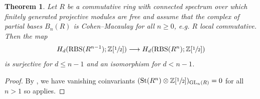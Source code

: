 \documentclass[12pt, reqno]{amsart}
\theoremstyle{plain}
\newtheorem{theorem}{Theorem}[section]
\theoremstyle{definition}
\newcommand{\Z}{\mathbb Z}
\begin{document}
\begin{theorem}\label{PID and partial bases}
Let $R$ be a commutative ring with connected spectrum over which finitely generated projective modules are free and assume that the complex of partial bases $B_n(R)$ is Cohen–Macaulay for all $n\geq 0$, e.g. $R$ local commutative. Then the map
\begin{align*}
H_d(\operatorname{RBS}(R^{n-1}); \Z[\sfrac{1}{2}])\longrightarrow H_d(\operatorname{RBS}(R^n); \Z[\sfrac{1}{2}])
\end{align*}
is surjective for $d\leq n-1$ and an isomorphism for $d< n-1$.
\end{theorem}
\begin{proof}
By \cite[Corollary 4.2]{BernardMillerSroka}, we have vanishing coinvariants $(
\operatorname{St}(R^n)\otimes \Z[\sfrac{1}{2}])_{\operatorname{GL}_n(R)}=0$ for all $n>1$ so  applies.
\end{proof}
\end{document}
